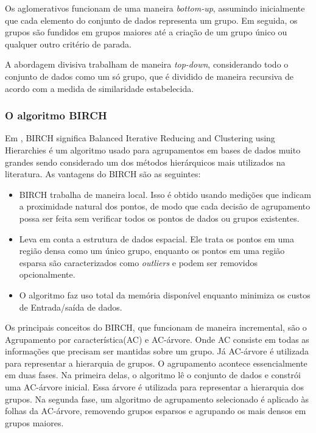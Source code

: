 Os aglomerativos funcionam de uma maneira \textit{bottom-up},
assumindo inicialmente que cada elemento do conjunto de dados representa um grupo. Em seguida, os grupos são fundidos em grupos maiores até a criação de um grupo único ou qualquer outro critério de parada.

A abordagem divisiva trabalham de maneira \textit{top-down}, considerando todo o conjunto de dados como um só
grupo, que é dividido de maneira recursiva de acordo com a medida de similaridade
estabelecida.

\subsubsection{O algoritmo BIRCH}

Em \cite{Zhang1996}, BIRCH significa Balanced Iterative Reducing and Clustering using Hierarchies é um algoritmo usado para agrupamentos em bases de dados muito grandes sendo considerado um dos métodos hierárquicos mais utilizados na literatura. As vantagens do BIRCH são as seguintes:

\begin{itemize}
	\item BIRCH trabalha de maneira local. Isso é obtido usando medições que indicam a proximidade natural dos pontos, de modo que cada decisão de agrupamento possa ser feita sem verificar todos os pontos de dados ou grupos existentes.
	\item Leva em conta a estrutura de dados espacial. Ele trata os pontos em uma região densa como um único grupo, enquanto os pontos em uma região esparsa são caracterizados como \textit{outliers} e podem ser removidos opcionalmente.
	\item O algoritmo faz uso total da memória disponível enquanto minimiza os custos de Entrada/saída de dados.
\end{itemize}

Os principais conceitos do BIRCH, que funcionam de maneira incremental, são o Agrupamento por característica(AC) e AC-árvore. Onde AC consiste em todas as informações que precisam ser mantidas sobre um grupo.
Já AC-árvore é utilizada para representar a hierarquia de grupos.
O agrupamento acontece essencialmente em duas fases. Na primeira delas, o algoritmo lê o conjunto de dados e constrói uma AC-árvore inicial. Essa árvore é utilizada para representar a hierarquia dos grupos. Na segunda fase, um algoritmo de agrupamento selecionado é aplicado às folhas da AC-árvore, removendo grupos esparsos e agrupando os mais densos em grupos maiores.

